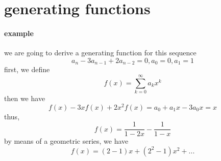 \documentclass{article}
\begin{document}
\section{generating functions}
  \paragraph{example}
    we are going to derive a generating function for this sequence
    \begin{equation}
      a_n - 3a_{n - 1} + 2a_{n - 2} = 0, a_0 = 0, a_1 = 1
    \end{equation}
    first, we define
    \begin{equation}
      f(x) = \sum_{k = 0}^\infty a_kx^k
    \end{equation}
    then we have
    \begin{equation}
      f(x) - 3xf(x) + 2x^2f(x) =a_0 + a_1x - 3a_0x = x
    \end{equation}
    thus,
    \begin{equation}
      f(x) = \frac{1}{1 - 2x} - \frac{1}{1 - x}
    \end{equation}
    by means of a geometric series, we have
    \begin{equation}
      f(x) = (2 - 1)x + (2^2 - 1)x^2 + ...
    \end{equation}
\end{document}
